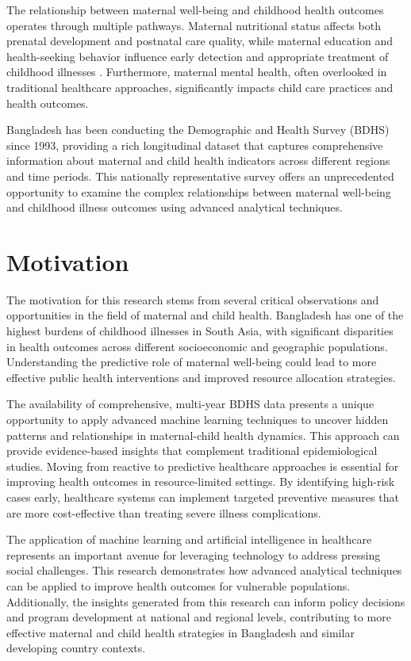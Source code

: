 \documentclass[12pt]{report}
\begin{document}
The relationship between maternal well-being and childhood health outcomes operates through multiple pathways. Maternal nutritional status affects both prenatal development and postnatal care quality, while maternal education and health-seeking behavior influence early detection and appropriate treatment of childhood illnesses \cite{ref3}. Furthermore, maternal mental health, often overlooked in traditional healthcare approaches, significantly impacts child care practices and health outcomes.

Bangladesh has been conducting the Demographic and Health Survey (BDHS) since 1993, providing a rich longitudinal dataset that captures comprehensive information about maternal and child health indicators across different regions and time periods. This nationally representative survey offers an unprecedented opportunity to examine the complex relationships between maternal well-being and childhood illness outcomes using advanced analytical techniques.

\section{Motivation}

The motivation for this research stems from several critical observations and opportunities in the field of maternal and child health. Bangladesh has one of the highest burdens of childhood illnesses in South Asia, with significant disparities in health outcomes across different socioeconomic and geographic populations. Understanding the predictive role of maternal well-being could lead to more effective public health interventions and improved resource allocation strategies.

The availability of comprehensive, multi-year BDHS data presents a unique opportunity to apply advanced machine learning techniques to uncover hidden patterns and relationships in maternal-child health dynamics. This approach can provide evidence-based insights that complement traditional epidemiological studies. Moving from reactive to predictive healthcare approaches is essential for improving health outcomes in resource-limited settings. By identifying high-risk cases early, healthcare systems can implement targeted preventive measures that are more cost-effective than treating severe illness complications.

The application of machine learning and artificial intelligence in healthcare represents an important avenue for leveraging technology to address pressing social challenges. This research demonstrates how advanced analytical techniques can be applied to improve health outcomes for vulnerable populations. Additionally, the insights generated from this research can inform policy decisions and program development at national and regional levels, contributing to more effective maternal and child health strategies in Bangladesh and similar developing country contexts.
\end{document}
